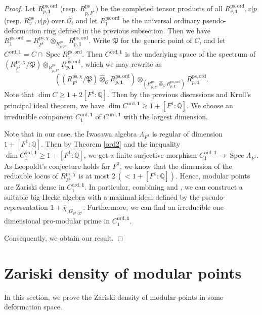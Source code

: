 \documentclass[a4paper, 12pt]{amsart}
\DeclareMathOperator{\Spec}{Spec}
\def\ps{\mathrm{ps}}
\def\ord{\mathrm{ord}}
\newcommand{\Q}{\mathbb{Q}}
\newcommand{\cO}{\mathcal{O}}
\newcommand{\kP}{\mathfrak{P}}
\begin{document}
\begin{proof}
    	Let $R^{\ps,\ord}_{p,\mathbf{1}}$ (resp. $R_{p, F^1}^\ps$) be the completed tensor products of all $R^{\ps,\ord}_{v,\mathbf{1}} ,v|p$ (resp. $R_v^\ps, v|p$) over $\cO$, and let $R^{\ps,\ord}_1$ be the universal ordinary pseudo-deformation ring defined in the previous subsection. Then we have $R^{\ps,\ord}_1=R_{F^1}^{\ps, \chi}\otimes_{R^{\ps}_{p, F^1}}R^{\ps,\ord}_{p,\mathbf{1}}$. Write $\kP$ for the generic point of $C$, and let $C^{\ord, \mathbf{1}} = C \cap \Spec R^{\ps,\ord}_1$.  Then $C^{\ord,\mathbf{1}}$ is the underlying space of the spectrum of $(R_{F^1}^{\ps, \chi}/\kP)\otimes_{R^{\ps}_{p, F^1}}R^{\ps,\ord}_{p,\mathbf{1}}$, which we may rewrite as 
    	\[((R_{F^1}^{\ps, \chi}/\kP)\hat{\otimes}_{\cO} R^{\ps,\ord}_{p,\mathbf{1}})\otimes_{(R^{\ps}_{p, F^1} \hat{\otimes}_{\cO} R^{\ps,\ord}_{p,\mathbf{1}})}R^{\ps,\ord}_{p,\mathbf{1}}.\]
    	Note that $\dim C \ge 1+2[F^1:\Q]$. Then by the previous discussions and Krull's principal ideal theorem, we have $\dim C^{\ord,\mathbf{1}} \ge 1+[F^1:\Q]$. We choose an irreducible component $ C_1^{\ord,\mathbf{1}}$ of $C^{\ord,\mathbf{1}} $ with the largest dimension.
    	
    	Note that in our case, the Iwasawa algebra $\Lambda_{F^1}$ is regular of dimension $1+[F^1:\Q] $. Then by Theorem \ref{ord2} and the inequality $\dim C_1^{\ord,\mathbf{1}} \ge 1+[F^1:\Q]$, we get a finite surjective morphism $C_1^{\ord,\mathbf{1}} \to \Spec \Lambda_{F^1} $. As Leopoldt's conjecture holds for $F^1$, we know that the dimension of the reducible locus of $ R_{F^1}^{\ps, \chi}$ is at most $2 ~( < 1+[F^1: \Q])$. Hence, modular points are Zariski dense in $C_1^{\ord,\mathbf{1}} $. In particular, combining \cite[Proposition 3.1.5]{Zhang:2024ab} and \cite[Lemma 4.8.5]{pan2022fontaine}, we can construct a suitable big Hecke algebra with a maximal ideal defined by the pseudo-representation $1+\bar{\chi}|_{G_{F^1, \Sigma^1}}$. Furthermore, we can find an irreducible one-dimensional pro-modular prime in $C_1^{\ord,\mathbf{1}} $.
    	
    	Consequently, we obtain our result.
    	
    \end{proof}
    
    \section{Zariski density of modular points}
    
    In this section, we prove the Zariski density of modular points in some deformation space.
    
\end{document}
